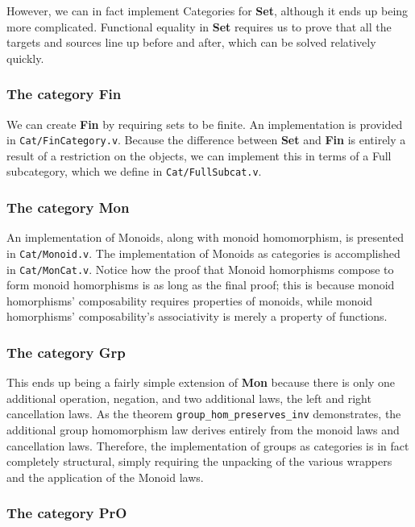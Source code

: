 \documentclass[12pt,twocolumn,oneside]{book}
\begin{document}
However, we can in fact implement Categories for \textbf{Set}, although it ends
up being more complicated. Functional equality in \textbf{Set} requires us to prove
that all the targets and sources line up before and after, which can be solved relatively
quickly.

\subsubsection{The category \textbf{Fin}}

We can create \textbf{Fin} by requiring sets to be finite. An implementation is
provided in \texttt{Cat/FinCategory.v}. Because the difference between \textbf{Set}
and \textbf{Fin} is entirely a result of a restriction on the objects, we can implement
this in terms of a Full subcategory, which we define in \texttt{Cat/FullSubcat.v}.

\subsubsection{The category \textbf{Mon}}

An implementation of Monoids, along with monoid homomorphism, is presented in
\texttt{Cat/Monoid.v}. The implementation of Monoids as categories is accomplished
in \texttt{Cat/MonCat.v}. Notice how the proof that Monoid homorphisms compose to form
monoid homorphisms is as long as the final proof; this is because monoid homorphisms'
composability requires properties of monoids, while monoid homorphisms' composability's
associativity is merely a property of functions.

\subsubsection{The category \textbf{Grp}}

This ends up being a fairly simple extension of \textbf{Mon} because there is only
one additional operation, negation, and two additional laws, the left and right
cancellation laws. As the theorem \texttt{group\_hom\_preserves\_inv} demonstrates,
the additional group homomorphism law derives entirely from the monoid laws and
cancellation laws. Therefore, the implementation of groups as categories is in
fact completely structural, simply requiring the unpacking of the various wrappers
and the application of the Monoid laws.

\subsubsection{The category \textbf{PrO}}
\end{document}
